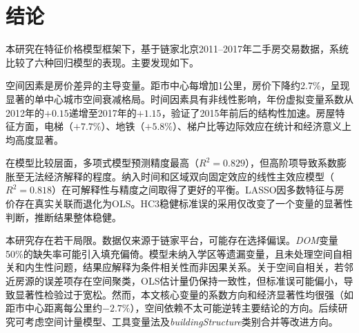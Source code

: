\documentclass[12pt,a4paper]{ctexart}
\begin{document}
\section{结论}

本研究在特征价格模型框架下，基于链家北京2011--2017年二手房交易数据，系统比较了六种回归模型的表现。主要发现如下。

空间因素是房价差异的主导变量。距市中心每增加1公里，房价下降约2.7\%，呈现显著的单中心城市空间衰减格局。时间因素具有非线性影响，年份虚拟变量系数从2012年的$+0.15$递增至2017年的$+1.15$，验证了2015年前后的结构性加速。房屋特征方面，电梯（$+7.7\%$）、地铁（$+5.8\%$）、梯户比等边际效应在统计和经济意义上均高度显著。

在模型比较层面，多项式模型预测精度最高（$R^{2}=0.829$），但高阶项导致系数膨胀至无法经济解释的程度。纳入时间和区域双向固定效应的线性主效应模型（$R^{2}=0.818$）在可解释性与精度之间取得了更好的平衡。LASSO因多数特征与房价存在真实关联而退化为OLS。HC3稳健标准误的采用仅改变了一个变量的显著性判断，推断结果整体稳健。

本研究存在若干局限。数据仅来源于链家平台，可能存在选择偏误。\textit{DOM}变量50\%的缺失率可能引入填充偏倚。模型未纳入学区等遗漏变量，且未处理空间自相关和内生性问题，结果应解释为条件相关性而非因果关系。关于空间自相关，若邻近房源的误差项存在空间聚类，OLS估计量仍保持一致性，但标准误可能偏小，导致显著性检验过于宽松。然而，本文核心变量的系数方向和经济显著性均很强（如距市中心距离每公里约$-2.7\%$），空间依赖不太可能逆转主要结论的方向。后续研究可考虑空间计量模型、工具变量法及\textit{buildingStructure}类别合并等改进方向。
\end{document}
